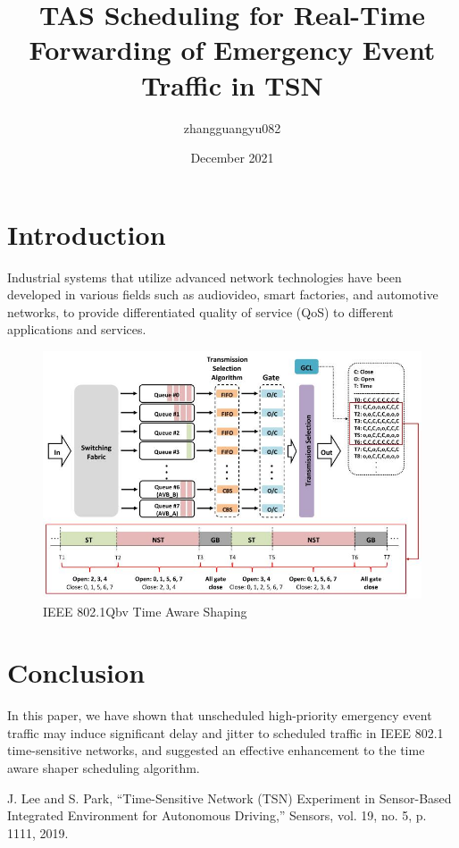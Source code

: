 \documentclass{article}
\title{TAS Scheduling for Real-Time Forwarding of Emergency Event Traffic in TSN}
\author{zhangguangyu082 }
\date{December 2021}
\begin{document}
\maketitle
\section{Introduction}
Industrial systems that utilize advanced network technologies have been developed in various fields such as audiovideo, smart factories, and automotive networks, to provide differentiated quality of service (QoS) to different applications and services.
\cite{ref1}

\begin{figure}[h!]
\centering
\includegraphics[scale=0.4]{TAS1}
\caption{IEEE 802.1Qbv Time Aware Shaping}
\label{fig:label}
\end{figure}

\section{Conclusion}
In this paper, we have shown that unscheduled high-priority emergency event traffic may induce significant delay and jitter to scheduled traffic in IEEE 802.1 time-sensitive networks, and suggested an effective enhancement to the time aware shaper scheduling algorithm.

\begin{thebibliography}{99}  

J. Lee and S. Park, “Time-Sensitive Network (TSN) Experiment in Sensor-Based Integrated Environment for Autonomous Driving,” Sensors, vol. 19, no. 5, p. 1111, 2019.

\end{thebibliography}
\end{document}
